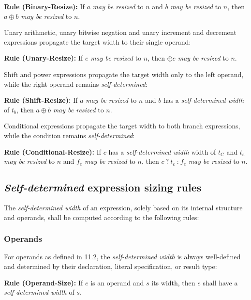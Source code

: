\documentclass{article}
\newcommand{\sds}{\emph{self-determined width}}
\newcommand{\mbr}{\emph{may be resized}}
\newenvironment{typingrule}[1]%
{\par\noindent\textbf{Rule (#1):} }%
{\par}
\begin{document}
\begin{typingrule}{Binary-Resize}
  If $a$ \mbr{} to $n$ and $b$ \mbr{} to $n$, then $a \oplus b$ \mbr{} to $n$.
\end{typingrule}

Unary arithmetic, unary bitwise negation and unary increment and decrement
expressions propagate the target width to their single operand:

\begin{typingrule}{Unary-Resize}
  If $e$ \mbr{} to $n$, then $\oplus e$ \mbr{} to $n$.
\end{typingrule}

Shift and power expressions propagate the target width only to the left operand,
while the right operand remains \emph{self-determined}:

\begin{typingrule}{Shift-Resize}
  If $a$ \mbr{} to $n$ and $b$ has a \sds{} of $t_{b}$, then
  $a \oplus b$ \mbr{} to $n$.
\end{typingrule}

Conditional expressions propagate the target width to both branch expressions,
while the condition remains \emph{self-determined}:

\begin{typingrule}{Conditional-Resize}
  If $c$ has a \sds{} width of $t_{C}$ and $t_{e}$ \mbr{} to $n$ and $f_{e}$
  \mbr{} to $n$, then $c~\texttt{?}~t_{e}~\texttt{:}~f_{e}$ \mbr{} to $n$.
\end{typingrule}

\subsection{\emph{Self-determined} expression sizing rules}%

The \sds{} of an expression, solely based on its internal
structure and operands, shall be computed according to the following rules:

\subsubsection{Operands}%

For operands as defined in 11.2, the \sds{} is always
well-defined and determined by their declaration, literal specification, or
result type:

\begin{typingrule}{Operand-Size}
  If $e$ is an operand and $s$ its width, then $e$ shall have a \sds{} of $s$.
\end{typingrule}
\end{document}
